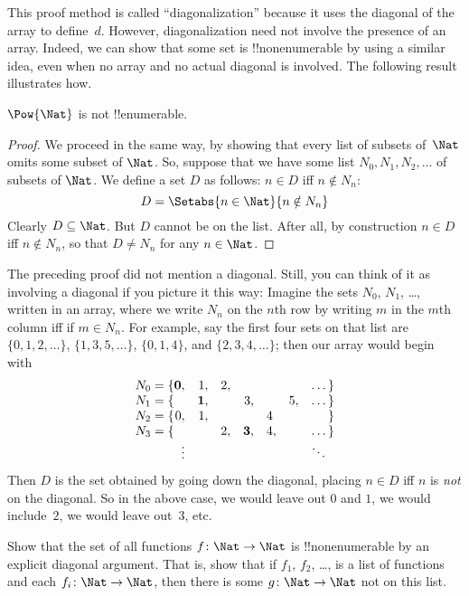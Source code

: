 \documentclass[../../../include/open-logic-section]{subfiles}
\begin{document}
\begin{explain}
This proof method is called ``diagonalization'' because it uses the
diagonal of the array to define~$d$. However, diagonalization need
not involve the presence of an array. Indeed, we can show that some set is 
!!{nonenumerable} by using a similar idea, even when no array and no
actual diagonal is involved. The following result illustrates how.
\end{explain}

\begin{thm}
$\Pow{\Nat}$ is not !!{enumerable}.
\end{thm}

\begin{proof}
We proceed in the same way, by showing that every list of subsets
of~$\Nat$ omits some subset of $\Nat$. 
So, suppose that we have some list $N_0, N_1, N_2, \ldots$ of subsets of $\Nat$. We define a set $D$ as follows:
$n \in D$ iff $n \notin N_{n}$:
\[
D = \Setabs{n \in \Nat}{n \notin N_n}
\]
Clearly $D\subseteq \Nat$. But $D$ cannot be on the list. After all, by construction $n \in D$ iff $n\notin N_n$, so that $D \neq N_n$ for any $n \in \Nat$. 
\end{proof}
\begin{explain}
The preceding proof did not mention a diagonal. Still, you can think of
it as involving a diagonal if you picture it this way: Imagine the
sets $N_0$, $N_1$, \dots, written in an array, where we write $N_n$ on the $n$th row by writing $m$ in the $m$th column iff if $m \in N_n$. For example, say the first
four sets on that list are $\{0,1,2,\dots\}$, $\{1, 3, 5, \dots\}$,
$\{0,1,4\}$, and $\{2,3,4,\dots\}$; then our array would begin with
\[
\begin{array}{r@{}rrrrrrr}
  N_0 = \{ & \mathbf{0}, & 1, & 2, & & & & \dots\}\\
  N_1 = \{ &  & \mathbf{1}, &  & 3, &  & 5, & \dots\}\\
  N_2 = \{ & 0, & 1, &  &  & 4\phantom{,} &  & \}\\
  N_3 = \{ &  &  & 2, & \mathbf{3}, & 4, & & \dots\}\\
  &\vdots & & & & & & \ddots\phantom{\}}
  \end{array}
\]
Then $D$ is the set obtained by going down the diagonal, placing $n \in D$ iff $n$ is \emph{not} on the diagonal. So in the
above case, we would leave out $0$ and $1$, we would include~$2$, we would leave
out~$3$, etc.
\end{explain}
\begin{prob}
Show that the set of all functions $f \colon \Nat \to \Nat$ is
!!{nonenumerable} by an explicit diagonal argument. That is, show that
if $f_1$, $f_2$, \dots, is a list of functions and each $f_i\colon
\Nat \to \Nat$, then there is some $g \colon \Nat \to
\Nat$ not on this list.
\end{prob}
\end{document}
